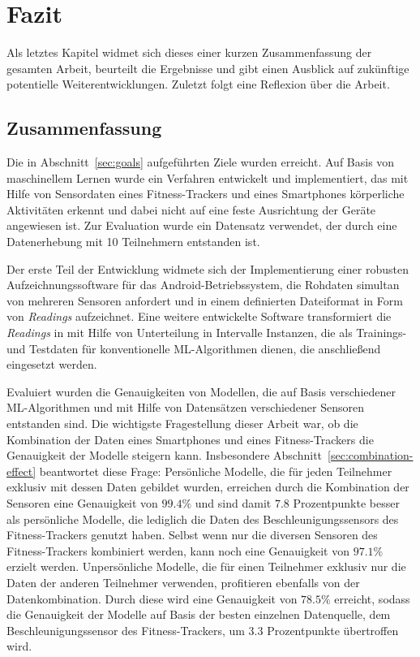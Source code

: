 \chapter{Fazit}
\label{chap:conclusions}

Als letztes Kapitel widmet sich dieses einer kurzen Zusammenfassung der gesamten Arbeit, beurteilt die Ergebnisse und gibt einen Ausblick auf zukünftige potentielle Weiterentwicklungen. Zuletzt folgt eine Reflexion über die Arbeit. 

\section{Zusammenfassung}
Die in Abschnitt~\ref{sec:goals} aufgeführten Ziele wurden erreicht. Auf Basis von maschinellem Lernen wurde ein Verfahren entwickelt und implementiert, das mit Hilfe von Sensordaten eines Fitness-Trackers und eines Smartphones körperliche Aktivitäten erkennt und dabei nicht auf eine feste Ausrichtung der Geräte angewiesen ist. Zur Evaluation wurde ein Datensatz verwendet, der durch eine Datenerhebung mit 10 Teilnehmern entstanden ist.

Der erste Teil der Entwicklung widmete sich der Implementierung einer robusten Aufzeichnungssoftware für das Android-Betriebssystem, die Rohdaten simultan von mehreren Sensoren anfordert und in einem definierten Dateiformat in Form von \textit{Readings} aufzeichnet. Eine weitere entwickelte Software transformiert die \textit{Readings} in mit Hilfe von Unterteilung in Intervalle Instanzen, die als Trainings- und Testdaten für konventionelle ML-Algorithmen dienen, die anschließend eingesetzt werden.

Evaluiert wurden die Genauigkeiten von Modellen, die auf Basis verschiedener ML-Algorithmen und mit Hilfe von Datensätzen verschiedener Sensoren entstanden sind. Die wichtigste Fragestellung dieser Arbeit war, ob die Kombination der Daten eines Smartphones und eines Fitness-Trackers die Genauigkeit der Modelle steigern kann. Insbesondere Abschnitt~\ref{sec:combination-effect} beantwortet diese Frage: Persönliche Modelle, die für jeden Teilnehmer exklusiv mit dessen Daten gebildet wurden, erreichen durch die Kombination der Sensoren eine Genauigkeit von $99.4 \%$ und sind damit $7.8$ Prozentpunkte besser als persönliche Modelle, die lediglich die Daten des Beschleunigungssensors des Fitness-Trackers genutzt haben. Selbst wenn nur die diversen Sensoren des Fitness-Trackers kombiniert werden, kann noch eine Genauigkeit von $97.1 \%$ erzielt werden. Unpersönliche Modelle, die für einen Teilnehmer exklusiv nur die Daten der anderen Teilnehmer verwenden, profitieren ebenfalls von der Datenkombination. Durch diese wird eine Genauigkeit von $78.5 \%$ erreicht, sodass die Genauigkeit der Modelle auf Basis der besten einzelnen Datenquelle, dem Beschleunigungssensor des Fitness-Trackers, um $3.3$ Prozentpunkte übertroffen wird.

